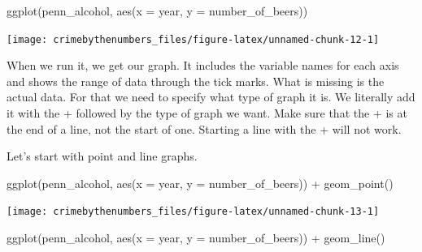 \documentclass[
]{krantz}
\makeatletter
\newenvironment{Shaded}{\begin{snugshade}}{\end{snugshade}}
\newcommand{\AttributeTok}[1]{\textcolor[rgb]{0.61,0.61,0.61}{#1}}
\newcommand{\FunctionTok}[1]{\textcolor[rgb]{0,0,0}{#1}}
\newcommand{\NormalTok}[1]{#1}
\newcommand{\OtherTok}[1]{\textcolor[rgb]{0.37,0.37,0.37}{#1}}
\newcommand{\SpecialCharTok}[1]{\textcolor[rgb]{0,0,0}{#1}}
\newenvironment{kframe}{%
\medskip{}
\setlength{\fboxsep}{.8em}
 \def\at@end@of@kframe{}%
 \ifinner\ifhmode%
  \def\at@end@of@kframe{\end{minipage}}%
  \begin{minipage}{\columnwidth}%
 \fi\fi%
 \def\FrameCommand##1{\hskip\@totalleftmargin \hskip-\fboxsep
 \colorbox{shadecolor}{##1}\hskip-\fboxsep
     \hskip-\linewidth \hskip-\@totalleftmargin \hskip\columnwidth}%
 \MakeFramed {\advance\hsize-\width
   \@totalleftmargin\z@ \linewidth\hsize
   \@setminipage}}%
 {\par\unskip\endMakeFramed%
 \at@end@of@kframe}
\renewenvironment{Shaded}{\begin{kframe}}{\end{kframe}}
\makeatother
\begin{document}
\begin{Shaded}
\end{Shaded}

\begin{Shaded}
\begin{Highlighting}[]
\FunctionTok{ggplot}\NormalTok{(penn\_alcohol, }\FunctionTok{aes}\NormalTok{(}\AttributeTok{x =}\NormalTok{ year, }\AttributeTok{y =}\NormalTok{ number\_of\_beers))}
\end{Highlighting}
\end{Shaded}

\begin{center}\texttt{[image: crimebythenumbers\_files/figure-latex/unnamed-chunk-12-1]} \end{center}

When we run it, we get our graph. It includes the variable names for each axis and shows the range of data through the tick marks. What is missing is the actual data. For that we need to specify what type of graph it is. We literally add it with the + followed by the type of graph we want. Make sure that the + is at the end of a line, not the start of one. Starting a line with the + will not work.

Let's start with point and line graphs.

\begin{Shaded}
\begin{Highlighting}[]
\FunctionTok{ggplot}\NormalTok{(penn\_alcohol, }\FunctionTok{aes}\NormalTok{(}\AttributeTok{x =}\NormalTok{ year, }\AttributeTok{y =}\NormalTok{ number\_of\_beers)) }\SpecialCharTok{+}
  \FunctionTok{geom\_point}\NormalTok{()}
\end{Highlighting}
\end{Shaded}

\begin{center}\texttt{[image: crimebythenumbers\_files/figure-latex/unnamed-chunk-13-1]} \end{center}

\begin{Shaded}
\begin{Highlighting}[]
\FunctionTok{ggplot}\NormalTok{(penn\_alcohol, }\FunctionTok{aes}\NormalTok{(}\AttributeTok{x =}\NormalTok{ year, }\AttributeTok{y =}\NormalTok{ number\_of\_beers)) }\SpecialCharTok{+}
  \FunctionTok{geom\_line}\NormalTok{()}
\end{Highlighting}
\end{Shaded}
\end{document}
